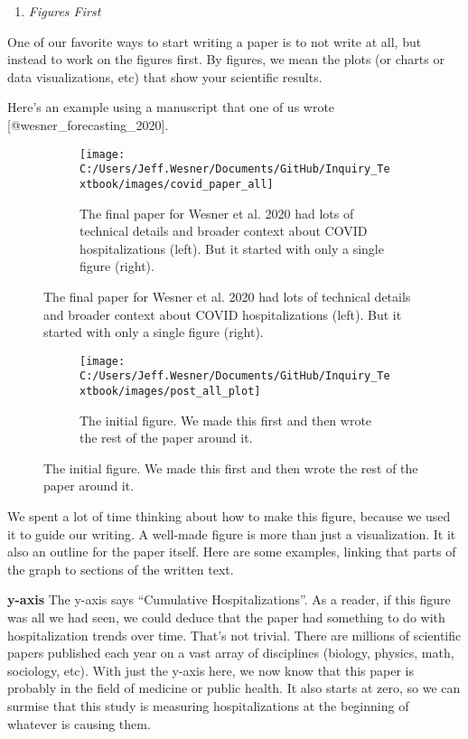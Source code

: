 \documentclass[
]{article}
\providecommand{\tightlist}{%
  \setlength{\itemsep}{0pt}\setlength{\parskip}{0pt}}
\begin{document}
\begin{enumerate}
\def\labelenumi{\arabic{enumi})}
\setcounter{enumi}{1}
\tightlist
\item
  \emph{Figures First}
\end{enumerate}

One of our favorite ways to start writing a paper is to not write at
all, but instead to work on the figures first. By figures, we mean the
plots (or charts or data visualizations, etc) that show your scientific
results.

Here's an example using a manuscript that one of us wrote
{[}@wesner\_forecasting\_2020{]}.

\begin{figure}
\begin{figure}
\texttt{[image: C:/Users/Jeff.Wesner/Documents/GitHub/Inquiry\_Textbook/images/covid\_paper\_all]} \caption{The final paper for Wesner et al. 2020 had lots of technical details and broader context about COVID hospitalizations (left). But it started with only a single figure (right).}\label{fig:unnamed-chunk-2}
\end{figure}
\end{figure}

\begin{figure}
\begin{figure}
\texttt{[image: C:/Users/Jeff.Wesner/Documents/GitHub/Inquiry\_Textbook/images/post\_all\_plot]} \caption{The initial figure. We made this first and then wrote the rest of the paper around it.}\label{fig:unnamed-chunk-3}
\end{figure}
\end{figure}

We spent a lot of time thinking about how to make this figure, because
we used it to guide our writing. A well-made figure is more than just a
visualization. It it also an outline for the paper itself. Here are some
examples, linking that parts of the graph to sections of the written
text.

\textbf{y-axis} The y-axis says ``Cumulative Hospitalizations''. As a
reader, if this figure was all we had seen, we could deduce that the
paper had something to do with hospitalization trends over time. That's
not trivial. There are millions of scientific papers published each year
on a vast array of disciplines (biology, physics, math, sociology, etc).
With just the y-axis here, we now know that this paper is probably in
the field of medicine or public health. It also starts at zero, so we
can surmise that this study is measuring hospitalizations at the
beginning of whatever is causing them.
\end{document}
